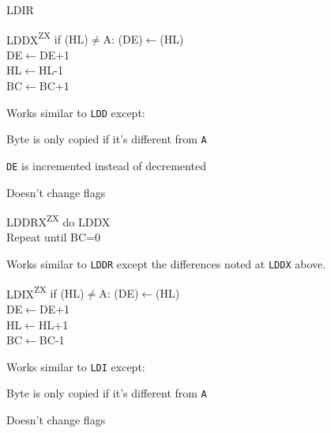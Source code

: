 \documentclass[12pt,twoside,openright,a4paper]{book}
\newcommand{\ZXN}{\textnormal{\textsuperscript{ZX}}}
\begin{document}
\begin{basedescript}{
	\desclabelstyle{\multilinelabel}
	\desclabelwidth{3cm}}
\begin{detailitem}{LDIR}
	\end{detailitem}

	\begin{detailitem}{LDDX\ZXN}
		{if (HL)$\neq$A: (DE)$\leftarrow$(HL)\\
		DE$\leftarrow$DE+1\\
		HL$\leftarrow$HL-1\\
		BC$\leftarrow$BC+1}

		Works similar to {\tt LDD} except:
		\begin{DetailCompactList}
			\item Byte is only copied if it's different from {\tt A}
			\item {\tt DE} is incremented instead of decremented
			\item Doesn't change flags
		\end{DetailCompactList}

		\DetailNoEffect
				
		\begin{DetailTiming}
		\end{DetailTiming}

	\end{detailitem}

	\begin{detailitem}{LDDRX\ZXN}
		{do LDDX\\
		Repeat until BC=0}

		Works similar to {\tt LDDR} except the differences noted at {\tt LDDX} above.

		\DetailNoEffect
					
		\begin{DetailTiming}
			\DetailTime{BC=0}{4}{16}
			\DetailTime{BC$\not=$0}{5}{21}
		\end{DetailTiming}

	\end{detailitem}

	\begin{detailitem}{LDIX\ZXN}
		{if (HL)$\neq$A: (DE)$\leftarrow$(HL)\\
		DE$\leftarrow$DE+1\\
		HL$\leftarrow$HL+1\\
		BC$\leftarrow$BC-1}

		Works similar to {\tt LDI} except:
		\begin{DetailCompactList}
			\item Byte is only copied if it's different from {\tt A}
			\item Doesn't change flags
		\end{DetailCompactList}


\end{detailitem}
\end{basedescript}
\end{document}

